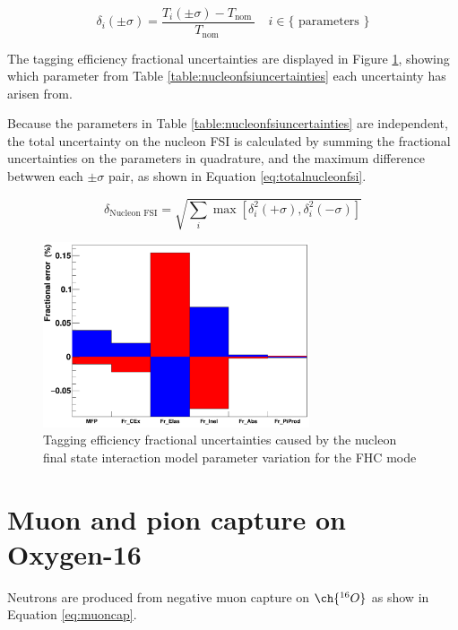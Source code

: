 \begin{equation}
\delta_{i}(\pm \sigma)=\frac{T_{i}(\pm \sigma)-T_{\text {nom }}}{T_{\text {nom }}} \quad i \in\{\text { parameters }\}
\label{eq:nucleonfsitageff}
\end{equation}

The tagging efficiency fractional uncertainties are displayed in Figure \ref{fig:nucleonfsiuncertainty}, showing which parameter from Table \ref{table:nucleonfsiuncertainties} each uncertainty has arisen from.

Because the parameters in Table \ref{table:nucleonfsiuncertainties} are independent, the total uncertainty on the nucleon FSI is calculated by summing the fractional uncertainties on the parameters in quadrature, and the maximum difference betwwen each $\pm \sigma$ pair, as shown in Equation \ref{eq:totalnucleonfsi}.

\begin{equation}
    \delta_{\text{Nucleon FSI}}=\sqrt{\sum_i \max \left[\delta_i^2(+\sigma), \delta_i^2(-\sigma)\right]}
\label{eq:totalnucleonfsi}
\end{equation}

\begin{figure}[!htb]
\centering 
    \includegraphics[width=0.7\textwidth]{Figures/nucleonfsi_uncertainty.png}
\caption{Tagging efficiency fractional uncertainties caused by the nucleon final state interaction model parameter variation for the FHC mode}
\label{fig:nucleonfsiuncertainty}
\end{figure}

\section{Muon and pion capture on Oxygen-16}

Neutrons are produced from negative muon capture on $\ch{^{16}O}$ as show in Equation \ref{eq:muoncap}.

